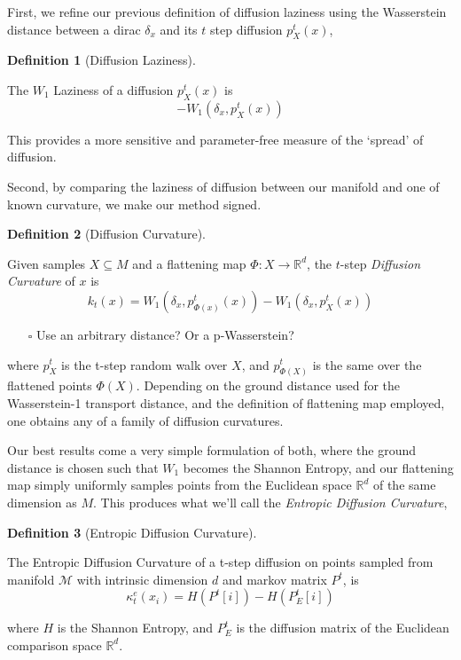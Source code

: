 \documentclass[
  letterpaper,
  DIV=11,
  numbers=noendperiod]{scrartcl}
\providecommand{\tightlist}{%
  \setlength{\itemsep}{0pt}\setlength{\parskip}{0pt}}\usepackage{longtable,booktabs,array}
\theoremstyle{plain}
\theoremstyle{plain}
\theoremstyle{definition}
\theoremstyle{plain}
\theoremstyle{definition}
\newtheorem{definition}{Definition}[section]
\theoremstyle{remark}
\begin{document}
First, we refine our previous definition of diffusion laziness using the
Wasserstein distance between a dirac \(\delta_{x}\) and its \(t\) step
diffusion \(p_{X}^t(x)\),

\begin{definition}[Diffusion
Laziness]\protect\hypertarget{def-laziness-of-diffusion}{}\label{def-laziness-of-diffusion}

The \(W_1\) Laziness of a diffusion \(p_{X}^t(x)\) is \[
- W_1\left(\delta_x, p_X^t(x)\right)
\]

\end{definition}

This provides a more sensitive and parameter-free measure of the
`spread' of diffusion.

Second, by comparing the laziness of diffusion between our manifold and
one of known curvature, we make our method signed.

\begin{definition}[Diffusion
Curvature]\protect\hypertarget{def-diffusion-curvature}{}\label{def-diffusion-curvature}

Given samples \(X \subseteq M\) and a flattening map
\(\Phi: X \rightarrow \mathbb{R}^d\), the \(t\)-step \emph{Diffusion
Curvature} of \(x\) is \[
k_t(x)=W_1\left(\delta_x, p_{\Phi(x)}^t(x)\right) - W_1\left(\delta_x, p_X^t(x)\right)
\]

\end{definition}

\begin{itemize}
\tightlist
\item[$\square$]
  Use an arbitrary distance? Or a p-Wasserstein?
\end{itemize}

where \(p_X^t\) is the t-step random walk over \(X\), and
\(p_{\Phi(X)}^t\) is the same over the flattened points \(\Phi(X)\).
Depending on the ground distance used for the Wasserstein-1 transport
distance, and the definition of flattening map employed, one obtains any
of a family of diffusion curvatures.

Our best results come a very simple formulation of both, where the
ground distance is chosen such that \(W_{1}\) becomes the Shannon
Entropy, and our flattening map simply uniformly samples points from the
Euclidean space \(\mathbb{R}^d\) of the same dimension as \(M\). This
produces what we'll call the \emph{Entropic Diffusion Curvature},

\begin{definition}[Entropic Diffusion
Curvature]\protect\hypertarget{def-entropic-diffusion-curvature}{}\label{def-entropic-diffusion-curvature}

The Entropic Diffusion Curvature of a t-step diffusion on points sampled
from manifold \(\mathcal{M}\) with intrinsic dimension \(d\) and markov
matrix \(P^t\), is \[
\kappa^e_{t}(x_{i}) = H(P^t[i]) - H(P_{E}^t[i])
\]

where \(H\) is the Shannon Entropy, and \(P_{E}^t\) is the diffusion
matrix of the Euclidean comparison space \(\mathbb{R}^d\).

\end{definition}
\end{document}
